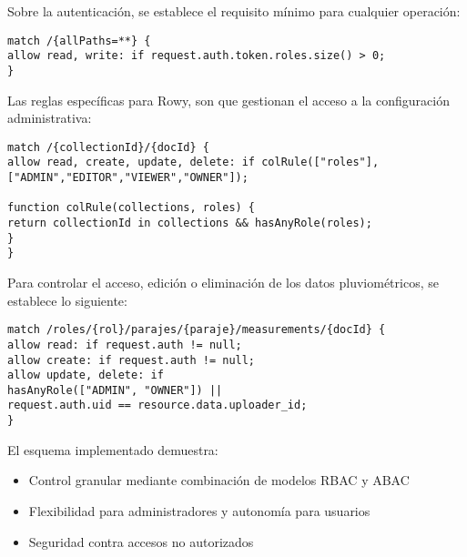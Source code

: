 Sobre la autenticación, se establece el requisito mínimo para cualquier operación:

\begin{verbatim}
match /{allPaths=**} {
allow read, write: if request.auth.token.roles.size() > 0;
}
\end{verbatim}

Las reglas específicas para Rowy, son que gestionan el acceso a la configuración administrativa:

\begin{verbatim}
match /{collectionId}/{docId} {
allow read, create, update, delete: if colRule(["roles"],
["ADMIN","EDITOR","VIEWER","OWNER"]);

function colRule(collections, roles) {
return collectionId in collections && hasAnyRole(roles);
}
}
\end{verbatim}


Para controlar el acceso, edición o eliminación de los datos pluviométricos, se establece lo siguiente:

\begin{verbatim}
match /roles/{rol}/parajes/{paraje}/measurements/{docId} {
allow read: if request.auth != null;
allow create: if request.auth != null;
allow update, delete: if
hasAnyRole(["ADMIN", "OWNER"]) ||
request.auth.uid == resource.data.uploader_id;
}
\end{verbatim}



El esquema implementado demuestra:

\begin{itemize}
\item Control granular mediante combinación de modelos RBAC y ABAC
\item Flexibilidad para administradores y autonomía para usuarios
\item Seguridad contra accesos no autorizados
\end{itemize}












